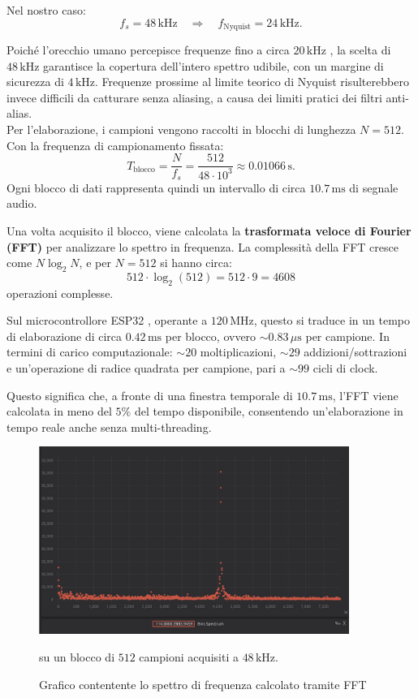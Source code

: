 Nel nostro caso:
\[
f_s = 48\,\text{kHz} \quad \Rightarrow \quad f_{\text{Nyquist}} = 24\,\text{kHz}.
\]

Poiché l’orecchio umano percepisce frequenze fino a circa $20\,\text{kHz}$ \cite{zwicker1999psychoacoustics}, la scelta di $48\,\text{kHz}$ garantisce la copertura dell’intero spettro udibile, con un margine di sicurezza di $4\,\text{kHz}$. Frequenze prossime al limite teorico di Nyquist risulterebbero invece difficili da catturare senza aliasing, a causa dei limiti pratici dei filtri anti-alias. \\

\noindent
Per l’elaborazione, i campioni vengono raccolti in blocchi di lunghezza $N = 512$. Con la frequenza di campionamento fissata:
\[
T_{\text{blocco}} = \frac{N}{f_s} = \frac{512}{48 \cdot 10^3} \approx 0.01066\,\text{s}.
\]
Ogni blocco di dati rappresenta quindi un intervallo di circa $10.7\,\text{ms}$ di segnale audio.  

\noindent
Una volta acquisito il blocco, viene calcolata la \textbf{trasformata veloce di Fourier (FFT)} \cite{cooley1965fft} per analizzare lo spettro in frequenza. La complessità della FFT cresce come $N \log_2 N$, e per $N=512$ si hanno circa:
\[
512 \cdot \log_2(512) = 512 \cdot 9 = 4608
\]
operazioni complesse.  

Sul microcontrollore ESP32 \cite{esp32techref}, operante a $120\,\text{MHz}$, questo si traduce in un tempo di elaborazione di circa $0.42\,\text{ms}$ per blocco, ovvero $\sim 0.83\,\mu\text{s}$ per campione. In termini di carico computazionale: $\sim 20$ moltiplicazioni, $\sim 29$ addizioni/sottrazioni e un’operazione di radice quadrata per campione, pari a $\sim 99$ cicli di clock.  

\noindent
Questo significa che, a fronte di una finestra temporale di $10.7\,\text{ms}$, l’FFT viene calcolata in meno del $5\%$ del tempo disponibile, consentendo un’elaborazione in tempo reale anche senza multi-threading.

\begin{figure}[H]
    \centering
    \includegraphics[width=0.9\textwidth]{immagini/fft_spectrum.png}
    \caption{Grafico contentente lo spettro di frequenza calcolato tramite FFT} su un blocco di $512$ campioni acquisiti a $48\,\text{kHz}$.
    \label{fig:spettro}
\end{figure}

